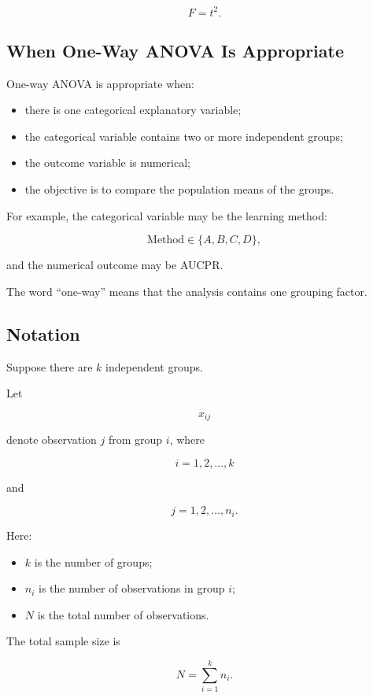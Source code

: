 \documentclass[11pt]{article}
\begin{document}
\[
F=t^2.
\]

\subsection{When One-Way ANOVA Is Appropriate}

One-way ANOVA is appropriate when:

\begin{itemize}[noitemsep]
    \item there is one categorical explanatory variable;
    \item the categorical variable contains two or more independent
    groups;
    \item the outcome variable is numerical;
    \item the objective is to compare the population means of the
    groups.
\end{itemize}

For example, the categorical variable may be the learning method:

\[
\text{Method}\in\{A,B,C,D\},
\]

and the numerical outcome may be AUCPR.

The word ``one-way'' means that the analysis contains one grouping
factor.

\subsection{Notation}

Suppose there are \(k\) independent groups.

Let

\[
x_{ij}
\]

denote observation \(j\) from group \(i\), where

\[
i=1,2,\ldots,k
\]

and

\[
j=1,2,\ldots,n_i.
\]

Here:

\begin{itemize}[noitemsep]
    \item \(k\) is the number of groups;
    \item \(n_i\) is the number of observations in group \(i\);
    \item \(N\) is the total number of observations.
\end{itemize}

The total sample size is

\[
N=\sum_{i=1}^{k}n_i.
\]
\end{document}
